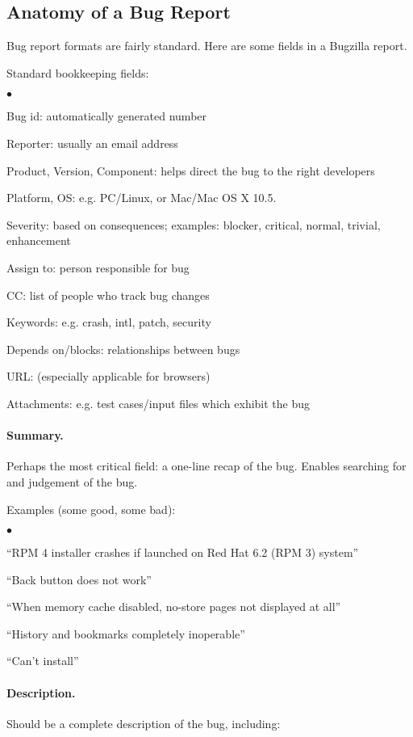 \documentclass[11pt]{article}
\newcommand{\squishlist}{
 \begin{list}{$\bullet$}
  { \setlength{\itemsep}{0pt}
     \setlength{\parsep}{3pt}
     \setlength{\topsep}{3pt}
     \setlength{\partopsep}{0pt}
     \setlength{\leftmargin}{1.5em}
     \setlength{\labelwidth}{1em}
     \setlength{\labelsep}{0.5em} } }
\newcommand{\squishend}{
  \end{list}  }
\begin{document}
\clearpage
\subsection*{Anatomy of a Bug Report}
Bug report formats are fairly standard. Here are some fields
in a Bugzilla report.

Standard bookkeeping fields:
\squishlist
\item Bug id: automatically generated number
\item Reporter: usually an email address
\item Product, Version, Component: helps direct the bug to the right developers
\item Platform, OS: e.g. PC/Linux, or Mac/Mac OS X 10.5.
\item Severity: based on consequences; examples: blocker, critical, normal, trivial, enhancement
\item Assign to: person responsible for bug
\item CC: list of people who track bug changes
\item Keywords: e.g. crash, intl, patch, security
\item Depends on/blocks: relationships between bugs
\item URL: (especially applicable for browsers)
\item Attachments: e.g. test cases/input files which exhibit the bug
\squishend

\paragraph{Summary.} Perhaps the most critical field: a one-line recap of the bug. Enables searching for and judgement of the bug.

Examples (some good, some bad):
\squishlist
\item ``RPM 4 installer crashes if launched on Red Hat 6.2 (RPM 3) system''
\item ``Back button does not work''
\item ``When memory cache disabled, no-store pages not displayed at all''
\item ``History and bookmarks completely inoperable''
\item ``Can't install''
\squishend

\paragraph{Description.} Should be a complete description of the bug, 
including:
\end{document}
